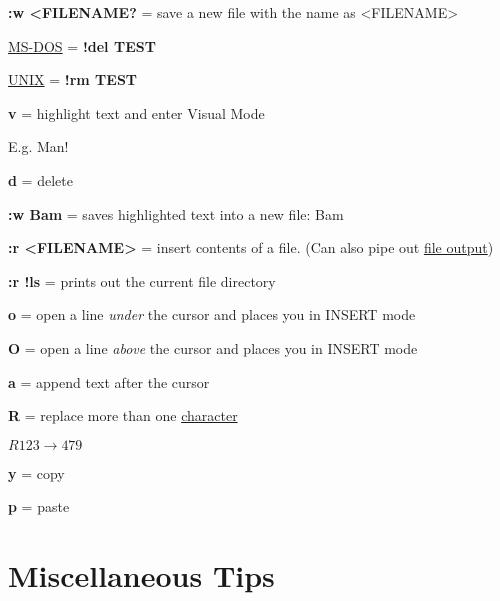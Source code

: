 \documentclass[12pt, letterpaper]{article}
\begin{document}
\begin{flushleft}
\textbf{:w <FILENAME?} = save a new file with the name as <FILENAME> \\
\par

\underline{MS-DOS} = \textbf{!del TEST} \par
\underline{UNIX} = \textbf{!rm TEST} \\
\par

\textbf{v} = highlight text and enter Visual Mode \\
\par
E.g. Man!  \\
\par
\textbf{d} = delete \\
\par
\textbf{:w Bam} = saves highlighted text into a new file: Bam \\
\par

\textbf{:r <FILENAME>} = insert contents of a file. (Can also pipe out \underline{file output}) \\
\par

\textbf{:r !ls} = prints out the current file directory \\
\par

\textbf{o} = open a line \textit{under} the cursor and places you in INSERT mode \\
\par

\textbf{O} = open a line \textit{above} the cursor and places you in INSERT mode \\
\par

\textbf{a} = append text after the cursor \\
\par

\textbf{R} = replace more than one \underline{character} \\
\par

$R 123 \rightarrow 479 $

\textbf{y} = copy \\
\par

\textbf{p} = paste \\
\par

\section{Miscellaneous Tips}


\end{flushleft}
\end{document}
